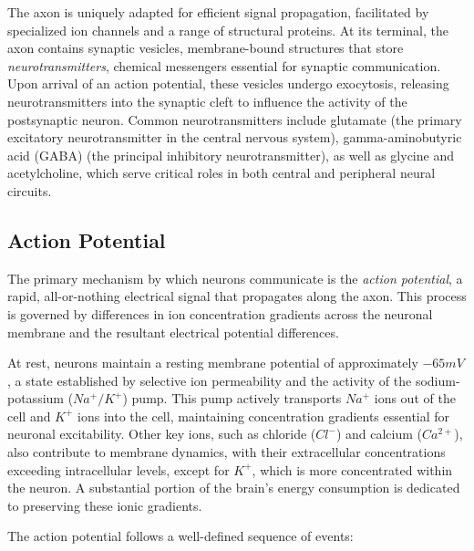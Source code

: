 The axon is uniquely adapted for efficient signal propagation, facilitated by specialized 
ion channels and a range of structural proteins. At its terminal, the axon contains 
synaptic vesicles, membrane-bound structures that store \emph{neurotransmitters}, chemical messengers 
essential for synaptic communication. Upon arrival of an action potential, these vesicles 
undergo exocytosis, releasing neurotransmitters into the synaptic cleft to influence the 
activity of the postsynaptic neuron. Common neurotransmitters include glutamate 
(the primary excitatory neurotransmitter in the central nervous system), 
gamma-aminobutyric acid (GABA) (the principal inhibitory neurotransmitter), 
as well as glycine and acetylcholine, which serve critical roles in both central and 
peripheral neural circuits.

\subsection{Action Potential}
\label{subsec:action_potential}
The primary mechanism by which neurons communicate is the \emph{action potential}, a rapid, 
all-or-nothing electrical signal that propagates along the axon. This process is governed 
by differences in ion concentration gradients across the neuronal membrane and the resultant 
electrical potential differences.

At rest, neurons maintain a resting membrane potential of approximately $-65 mV$, a 
state established by selective ion permeability and the activity of the sodium-potassium 
($Na^{+}/K^{+}$) pump. This pump actively transports $Na^{+}$ ions out of the cell and $K^{+}$ 
ions into the cell, maintaining concentration gradients essential for neuronal excitability. Other 
key ions, such as chloride ($Cl^{-}$) and calcium ($Ca^{2+}$), also contribute to membrane dynamics, 
with their extracellular concentrations exceeding intracellular levels, except for $K^{+}$, which 
is more concentrated within the neuron. A substantial portion of the brain's energy 
consumption is dedicated to preserving these ionic gradients.

The action potential follows a well-defined sequence of events:

